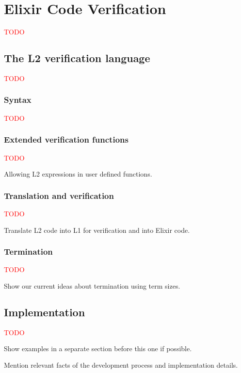 \chapter{Elixir Code Verification}
\label{cap:elixirCodeVerification}


\textcolor{red}{TODO}

\section{The L2 verification language}

\textcolor{red}{TODO}

\subsection{Syntax}

\textcolor{red}{TODO}

\subsection{Extended verification functions}

\textcolor{red}{TODO}

Allowing L2 expressions in user defined functions.

\subsection{Translation and verification}

\textcolor{red}{TODO}

Translate L2 code into L1 for verification and into Elixir code.

\subsection{Termination}

\textcolor{red}{TODO}

Show our current ideas about termination using term sizes.

\section{Implementation}

\textcolor{red}{TODO}

Show examples in a separate section before this one if possible.

Mention relevant facts of the development process and implementation details.
